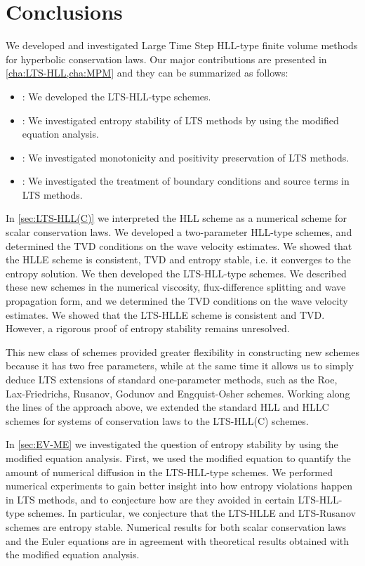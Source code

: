 \label{cha:Conclusions}

\section{Conclusions}

We developed and investigated Large Time Step HLL-type finite volume methods for hyperbolic conservation laws. Our major contributions are presented in \cref{cha:LTS-HLL,cha:MPM} and they can be summarized as follows:
\begin{itemize}
\item {}: We developed the LTS-HLL-type schemes.

\item {}: We investigated entropy stability of LTS methods by using the modified equation analysis.

\item {}: We investigated monotonicity and positivity preservation of LTS methods. 

\item {}: We investigated the treatment of boundary conditions and source terms in LTS methods.

\end{itemize}

In \cref{sec:LTS-HLL(C)} we interpreted the HLL scheme as a numerical scheme for scalar conservation laws. We developed a two-parameter HLL-type schemes, and determined the TVD conditions on the wave velocity estimates. We showed that the HLLE scheme is consistent, TVD and entropy stable, i.e. it converges to the entropy solution. We then developed the LTS-HLL-type schemes. We described these new schemes in the numerical viscosity, flux-difference splitting and wave propagation form, and we determined the TVD conditions on the wave velocity estimates. We showed that the LTS-HLLE scheme is consistent and TVD. However, a rigorous proof of entropy stability remains unresolved. 

This new class of schemes provided greater flexibility in constructing new schemes because it has two free parameters, while at the same time it allows us to simply deduce LTS extensions of standard one-parameter methods, such as the Roe, Lax-Friedrichs, Rusanov, Godunov and Engquist-Osher schemes. Working along the lines of the approach above, we extended the standard HLL and HLLC schemes for systems of conservation laws to the LTS-HLL(C) schemes. 

In \cref{sec:EV-ME} we investigated the question of entropy stability by using the modified equation analysis. First, we used the modified equation to quantify the amount of numerical diffusion in the LTS-HLL-type schemes. We performed numerical experiments to gain better insight into how entropy violations happen in LTS methods, and to conjecture how are they avoided in certain LTS-HLL-type schemes. In particular, we conjecture that the LTS-HLLE and LTS-Rusanov schemes are entropy stable. Numerical results for both scalar conservation laws and the Euler equations are in agreement with theoretical results obtained with the modified equation analysis.

